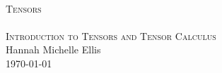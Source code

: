 \begin{titlepage}
\begin{center}
\HRule \\[0.5cm]
\textsc{\huge Tensors}\\[0.5cm]
\HRule \\[0.5cm]
\textsc{\Large Introduction to Tensors and Tensor Calculus}\\[0.5cm]
\vfill
Hannah Michelle Ellis\\[1.0cm]
\today
\end{center}
\end{titlepage}
\thispagestyle{empty}
